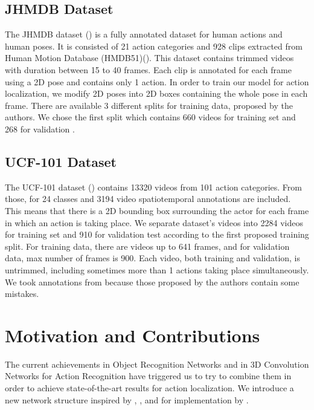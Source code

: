\subsection{JHMDB Dataset}
The JHMDB dataset (\cite{Jhuang:ICCV:2013}) is a fully annotated dataset for human actions and human poses. It is consisted of 21 action categories and 928
clips extracted from Human Motion Database (HMDB51)(\cite{Kuehne11}). This dataset contains trimmed videos with duration between
15 to 40 frames. Each clip is annotated for each frame using a 2D pose and contains only 1 action.
In order to train our model for action localization, we modify 2D poses into 2D boxes containing the whole pose in each frame.
There are available 3 different splits for training data, proposed by the authors. We chose the first split which contains 660
videos for training set and 268 for validation . 

\subsection{UCF-101 Dataset}
The UCF-101 dataset (\cite{soomro2012ucf101}) contains 13320 videos from 101 action categories.
From those, for 24 classes and 3194 video spatiotemporal annotations are included. This means that there is a 2D bounding box surrounding the actor for each frame in which an action is taking place.
We separate dataset's videos into 2284 videos for training set and 910 for validation test according to the
first proposed training split. For training data, there are videos up to 641 frames, and for validation data, max number of frames is 900.
Each video, both training and validation, is untrimmed, including sometimes more than 1 actions taking place simultaneously.
We took annotations from \cite{singh2016online} because those  proposed by the authors contain some mistakes.

\section{Motivation and Contributions}
The current achievements in Object Recognition Networks and in 3D Convolution Networks for Action Recognition have triggered us to try
to combine them in order to achieve state-of-the-art results for action localization. We introduce a new network structure inspired by
\cite{DBLP:journals/corr/HouCS17}, \cite{DBLP:journals/corr/abs-1712-09184},\cite{Ren:2015:FRT:2969239.2969250} and for implementation
by \cite{jjfaster2rcnn}.

